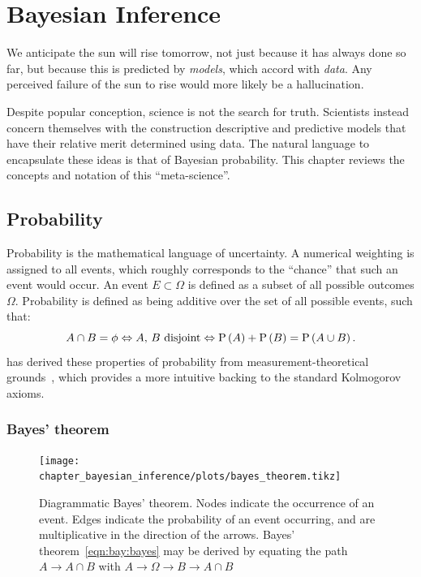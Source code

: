 \chapter{Bayesian Inference}
\label{chap:bay}

\epigraph{We anticipate the sun will rise tomorrow, not just because it has always done so far, but because this is predicted by {\em models}, which accord with {\em data}. Any perceived failure of the sun to rise would more likely be a hallucination.}{\davidmackay{}}

Despite popular conception, science is not the search for truth. Scientists instead concern themselves with the construction descriptive and predictive models that have their relative merit determined using data.
The natural language to encapsulate these ideas is that of Bayesian probability. This chapter reviews the concepts and notation of this ``meta-science''.

\section{Probability}
\label{sec:bay:prob}

Probability is the mathematical language of uncertainty. 
A numerical weighting is assigned to all events, which roughly corresponds to the ``chance'' that such an event would occur. An event $E\subset \Omega$ is defined as a subset of all possible outcomes $\Omega$. Probability is defined as being additive over the set of all possible events, such that:
\begin{equation}
  A\cap B = \phi \Leftrightarrow \text{$A$, $B$ disjoint} \Leftrightarrow \mathrm{P}\left(A\right) + \mathrm{P}\left(B\right) = \mathrm{P}\left(A\cup B\right).
\end{equation}
\johnskilling{} has derived these properties of probability from measurement-theoretical grounds~\citep[chap. 1]{Bayesian_methods_in_cosmology}, which provides a more intuitive backing to the standard Kolmogorov axioms.

\subsection{Bayes' theorem}

\begin{figure}[ht]
  \centering
  \texttt{[image: chapter\_bayesian\_inference/plots/bayes\_theorem.tikz]}
  \caption{Diagrammatic Bayes' theorem. Nodes indicate the occurrence of an event. Edges indicate the probability of an event occurring, and are multiplicative in the direction of the arrows. Bayes' theorem~\protect\eqref{eqn:bay:bayes} may be derived by equating the path $A\to A\cap B$ with $A\to\Omega\to B\to A\cap B$}\label{fig:bay:bayes_theorem}
\end{figure}


